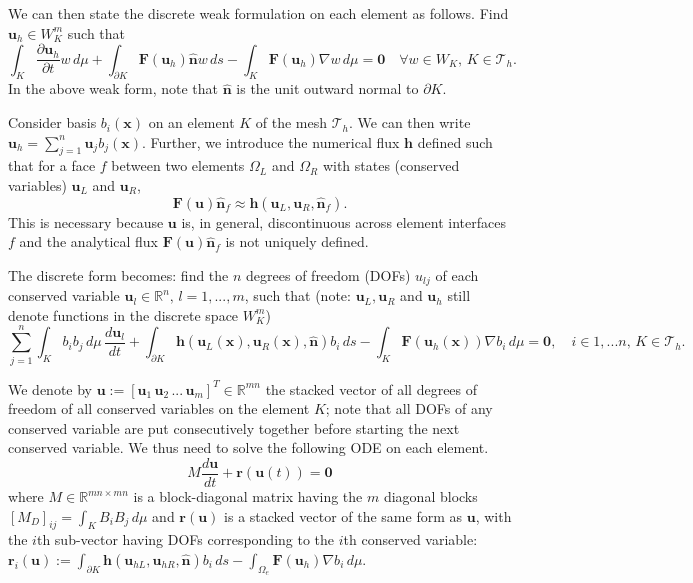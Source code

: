 \documentclass[11pt]{article}
\let\bld\boldsymbol
\begin{document}
We can then state the discrete weak formulation on each element as follows. Find $\bld{u}_h \in W_{K}^m$ such that
\begin{equation}
\int_{K} \frac{\partial\bld{u}_h}{\partial t}w\,d\mu + \int_{\partial K} \bld{F}(\bld{u}_h)\hat{\bld{n}}w \,ds - \int_{K}\bld{F}(\bld{u}_h)\nabla w \,d\mu = \bld{0} \quad \forall w \in W_{K},\, K \in \mathcal{T}_h.
\label{wf}
\end{equation}
In the above weak form, note that $\hat{\bld{n}}$ is the unit outward normal to $\partial K$.

Consider basis $b_i(\bld{x})$ on an element $K$ of the mesh $\mathcal{T}_h$. We can then write $\bld{u}_h = \sum_{j=1}^n \bld{u}_j b_j(\bld{x})$. Further, we introduce the numerical flux $\bld{h}$ defined such that for a face $f$ between two elements $\Omega_L$ and $\Omega_R$ with states (conserved variables) $\bld{u}_L$ and $ \bld{u}_R$,
\begin{equation}
\bld{F}(\bld{u})\hat{\bld{n}}_f \approx \bld{h}(\bld{u}_L, \bld{u}_R, \hat{\bld{n}}_f).
\end{equation}
This is necessary because $\bld{u}$ is, in general, discontinuous across element interfaces $f$ and the analytical flux $\bld{F}(\bld{u})\hat{\bld{n}}_f$ is not uniquely defined.

The discrete form becomes: find the $n$ degrees of freedom (DOFs) $u_{lj}$ of each conserved variable $\bld{u}_l \in \mathbb{R}^n,\, l=1,...,m$, such that (note: $\bld{u}_L, \bld{u}_R$ and $\bld{u}_h$ still denote functions in the discrete space $W_{K}^m$)
\begin{equation}
\sum_{j=1}^n\int_{K} b_ib_j\,d\mu\, \frac{d\bld{u}_{l}}{d t} + \int_{\partial K}  \bld{h}(\bld{u}_L(\bld{x}), \bld{u}_R(\bld{x}), \hat{\bld{n}})b_i \,ds - \int_{K}\bld{F}(\bld{u}_h(\bld{x}))\nabla b_i \,d\mu = \bld{0}, \quad i \in {1,...n},\, K \in \mathcal{T}_h.
\label{df}
\end{equation}

We denote by $\mathbf{u} := [\bld{u}_1\, \bld{u}_2\, ...\, \bld{u}_m]^T \in \mathbb{R}^{mn}$ the stacked vector of all degrees of freedom of all conserved variables on the element $K$; note that all DOFs of any conserved variable are put consecutively together before starting the next conserved variable. We thus need to solve the following ODE on each element.
\begin{equation}
M \frac{d\mathbf{u}}{dt} + \bld{r}(\mathbf{u}(t)) = \bld{0}
\label{ode}
\end{equation}
where $M \in \mathbb{R}^{mn\times mn}$ is a block-diagonal matrix having the $m$ diagonal blocks $[M_D]_{ij} = \int_{K} B_iB_j\,d\mu$ and $\bld{r}(\mathbf{u})$ is a stacked vector of the same form as $\mathbf{u}$, with the $i$th sub-vector having DOFs corresponding to the $i$th conserved variable: $\bld{r}_i(\mathbf{u}) :=  \int_{\partial K}  \bld{h}(\bld{u}_{hL}, \bld{u}_{hR}, \hat{\bld{n}})b_i \,ds - \int_{\Omega_e}\bld{F}(\bld{u}_h)\nabla b_i \,d\mu$.
\end{document}
